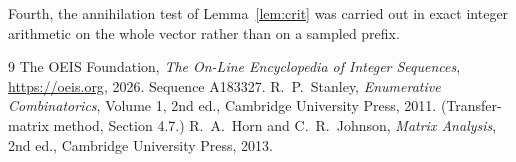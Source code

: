 \documentclass[11pt,a4paper]{article}
\theoremstyle{plain}
\theoremstyle{definition}
\begin{document}
Fourth, the annihilation test of Lemma~\ref{lem:crit} was carried out in exact integer
arithmetic on the whole vector rather than on a sampled prefix.

\begin{thebibliography}{9}
 The OEIS Foundation, \emph{The On-Line Encyclopedia of Integer
Sequences}, \url{https://oeis.org}, 2026. Sequence A183327.
 R.~P.~Stanley, \emph{Enumerative Combinatorics}, Volume 1, 2nd ed.,
Cambridge University Press, 2011. (Transfer-matrix method, Section 4.7.)
 R.~A.~Horn and C.~R.~Johnson, \emph{Matrix Analysis}, 2nd ed., Cambridge
University Press, 2013.
\end{thebibliography}
\end{document}
